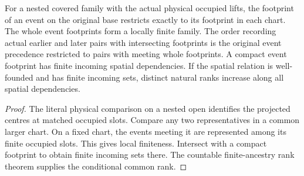 \begin{theorem}
\label{hir:g8-spatial-cofinal-precedence}
\leanok
For a nested covered family with the actual physical occupied
lifts, the footprint of an event on the original base restricts
exactly to its footprint in each chart. The whole event footprints
form a locally finite family. The order recording actual earlier
and later pairs with intersecting footprints is the original event
precedence restricted to pairs with meeting whole footprints.
A compact event footprint has finite incoming spatial dependencies.
If the spatial relation is well-founded and has finite incoming
sets, distinct natural ranks increase along all spatial dependencies.
\end{theorem}
\begin{proof}
The literal physical comparison on a nested open identifies the
projected centres at matched occupied slots. Compare any two
representatives in a common larger chart. On a fixed chart, the
events meeting it are represented among its finite occupied slots.
This gives local finiteness. Intersect with a compact footprint to
obtain finite incoming sets there. The countable finite-ancestry
rank theorem supplies the conditional common rank.
\end{proof}

